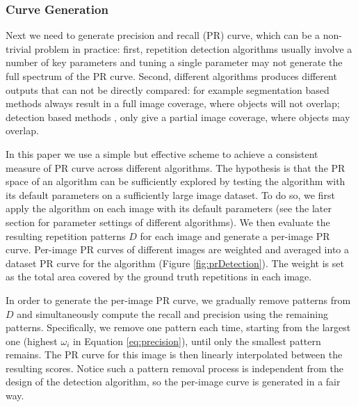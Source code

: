 \documentclass{acmtog}
\begin{document}
\subsubsection{Curve Generation}

Next we need to generate precision and recall (PR) curve, which can be a non-trivial problem in practice: first, repetition detection algorithms usually involve a number of key parameters and tuning a single parameter may not generate the full spectrum of the PR curve. Second, different algorithms produces different outputs that can not be directly compared: for example segmentation based methods \cite{LIPMANsig2010} always result in a full image coverage, where objects will not overlap; detection based methods \cite{Wu2010DL},\cite{Liu2013GRASP} only give a partial image coverage, where objects may overlap. 

In this paper we use a simple but effective scheme to achieve a consistent measure of PR curve across different algorithms. The hypothesis is that the PR space of an algorithm can be sufficiently explored by testing the algorithm with its default parameters on a sufficiently large image dataset. To do so, we first apply the algorithm on each image with its default parameters (see the later section for parameter settings of different algorithms). We then evaluate the resulting repetition patterns $D$ for each image and generate a per-image PR curve. Per-image PR curves of different images are weighted and averaged into a dataset PR curve for the algorithm (Figure \ref{fig:prDetection}). The weight is set as the total area covered by the ground truth repetitions in each image.   

In order to generate the per-image PR curve, we gradually remove patterns from $D$ and simultaneously compute the recall and precision using the remaining patterns. Specifically, we remove one pattern each time, starting from the largest one (highest $\omega_{i}$ in Equation \ref{eq:precision}), until only the smallest pattern remains. The PR curve for this image is then linearly interpolated between the resulting scores. Notice such a pattern removal process is independent from the design of the detection algorithm, so the per-image curve is generated in a fair way.
\begin{figure*}[t!]
    \centering
    \enskip
    \enskip
    \enskip
    \caption{Quantitative comparison between different repetition detection methods.}%
    \label{fig:prDetection}%
\end{figure*}
\end{document}
